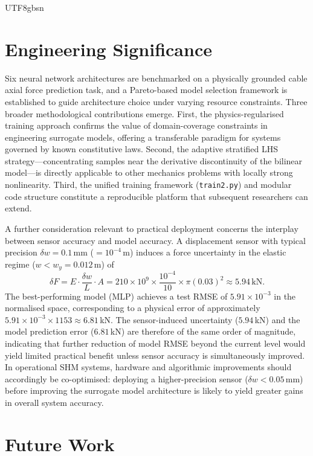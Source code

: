 \documentclass[a4paper,12pt]{report}
\begin{document}
\begin{CJK}{UTF8}{gbsn}
\section{Engineering Significance}
\label{sec:significance}

Six neural network architectures are benchmarked on a physically grounded cable
axial force prediction task, and a Pareto-based model selection framework is established
to guide architecture choice under varying resource constraints. Three broader
methodological contributions emerge. First, the physics-regularised training approach
confirms the value of domain-coverage constraints in engineering surrogate models,
offering a transferable paradigm for systems governed by known constitutive laws.
Second, the adaptive stratified LHS strategy---concentrating samples near the
derivative discontinuity of the bilinear model---is directly applicable to other
mechanics problems with locally strong nonlinearity. Third, the unified training
framework (\texttt{train2.py}) and modular code structure constitute a reproducible
platform that subsequent researchers can extend.

A further consideration relevant to practical deployment concerns the interplay between
sensor accuracy and model accuracy. A displacement sensor with typical precision
$\delta w = 0.1$\,mm ($= 10^{-4}$\,m) induces a force uncertainty in the elastic regime
($w < w_y = 0.012$\,m) of
\[
  \delta F = E \cdot \frac{\delta w}{L} \cdot A
           = 210\times10^9 \times \frac{10^{-4}}{10} \times \pi(0.03)^2
           \approx 5.94\,\mathrm{kN}.
\]
The best-performing model (MLP) achieves a test RMSE of $5.91\times10^{-3}$ in the
normalised space, corresponding to a physical error of approximately
$5.91\times10^{-3}\times1153\approx6.81$\,kN. The sensor-induced uncertainty
($5.94$\,kN) and the model prediction error ($6.81$\,kN) are therefore of the same order
of magnitude, indicating that further reduction of model RMSE beyond the current level
would yield limited practical benefit unless sensor accuracy is simultaneously improved.
In operational SHM systems, hardware and algorithmic improvements should accordingly be
co-optimised: deploying a higher-precision sensor ($\delta w < 0.05$\,mm) before
improving the surrogate model architecture is likely to yield greater gains in overall
system accuracy.

\section{Future Work}
\label{sec:future}


\end{CJK}
\end{document}
